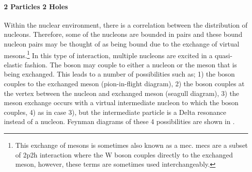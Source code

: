 \paragraph{2 Particles 2 Holes}
Within the nuclear environment, there is a correlation between the distribution of nucleons. Therefore, some of the nucleons are bounded in pairs and these bound nucleon pairs may be thought of as being bound due to the exchange of virtual mesons.\footnote{This exchange of mesons is sometimes also known as a \gls{mec}. \glspl{mec} are a subset of \gls{2p2h} interaction where the W boson couples directly to the exchanged meson, however, these terms are sometimes used interchangeably.} In this type of interaction, multiple nucleons are excited in a quasi-elastic fashion. The boson may couple to either a nucleon or the meson that is being exchanged. This leads to a number of possibilities such as; 1) the boson couples to the exchanged meson (pion-in-flight diagram), 2) the boson couples at the vertex between the nucleon and exchanged meson (seagull diagram), 3) the meson exchange occurs with a virtual intermediate nucleon to which the boson couples, 4) as in case 3), but the intermediate particle is a Delta resonance instead of a nucleon. Feynman diagrams of these 4 possibilities are shown in  \cite{Measurement_of_the_Antineutrino_Double-Differential_Charged-Current_Quasi-Elastic_Scattering_Cross_Section_at_MINERvA_book}\cite{Adjusting_neutrino_interaction_models_and_evaluating_uncertainties_using_NOvA_near_detector_data}
\cite{Seagull_and_pion-in-flight_mec}.


